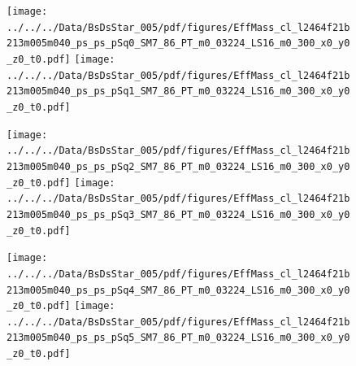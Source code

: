 \documentclass[a4paper,10pt]{article}
\begin{document}
\clearpage
\begin{figure}[p]
 \texttt{[image: ../../../Data/BsDsStar\_005/pdf/figures/EffMass\_cl\_l2464f21b213m005m040\_ps\_ps\_pSq0\_SM7\_86\_PT\_m0\_03224\_LS16\_m0\_300\_x0\_y0\_z0\_t0.pdf]} 
 \texttt{[image: ../../../Data/BsDsStar\_005/pdf/figures/EffMass\_cl\_l2464f21b213m005m040\_ps\_ps\_pSq1\_SM7\_86\_PT\_m0\_03224\_LS16\_m0\_300\_x0\_y0\_z0\_t0.pdf]} 
 \end{figure}
\begin{figure}[p]
 \texttt{[image: ../../../Data/BsDsStar\_005/pdf/figures/EffMass\_cl\_l2464f21b213m005m040\_ps\_ps\_pSq2\_SM7\_86\_PT\_m0\_03224\_LS16\_m0\_300\_x0\_y0\_z0\_t0.pdf]} 
 \texttt{[image: ../../../Data/BsDsStar\_005/pdf/figures/EffMass\_cl\_l2464f21b213m005m040\_ps\_ps\_pSq3\_SM7\_86\_PT\_m0\_03224\_LS16\_m0\_300\_x0\_y0\_z0\_t0.pdf]} 
 \end{figure}
\begin{figure}[p]
 \texttt{[image: ../../../Data/BsDsStar\_005/pdf/figures/EffMass\_cl\_l2464f21b213m005m040\_ps\_ps\_pSq4\_SM7\_86\_PT\_m0\_03224\_LS16\_m0\_300\_x0\_y0\_z0\_t0.pdf]} 
 \texttt{[image: ../../../Data/BsDsStar\_005/pdf/figures/EffMass\_cl\_l2464f21b213m005m040\_ps\_ps\_pSq5\_SM7\_86\_PT\_m0\_03224\_LS16\_m0\_300\_x0\_y0\_z0\_t0.pdf]} 
 \end{figure}
\clearpage
\clearpage
\end{document}

